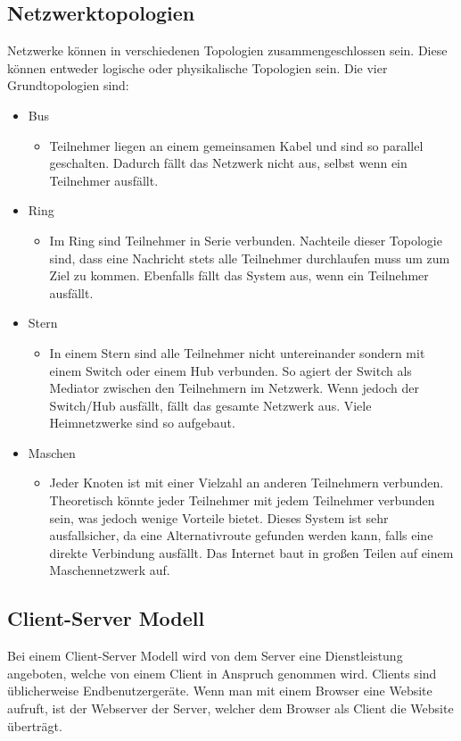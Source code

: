 \documentclass{article}
\begin{document}
	 \subsection{Netzwerktopologien}
	 Netzwerke können in verschiedenen Topologien zusammengeschlossen sein. Diese können entweder logische oder physikalische Topologien sein. Die vier Grundtopologien sind:
	 \begin{itemize}
	 	\item{Bus}
	 	\begin{itemize}
	 		\item{Teilnehmer liegen an einem gemeinsamen Kabel und sind so parallel geschalten. Dadurch fällt das Netzwerk nicht aus, selbst wenn ein Teilnehmer ausfällt.}
	 	\end{itemize}
	 	\item{Ring}
	 	\begin{itemize}
	 		\item{Im Ring sind Teilnehmer in Serie verbunden. Nachteile dieser Topologie sind, dass eine Nachricht stets alle Teilnehmer durchlaufen muss um zum Ziel zu kommen. Ebenfalls fällt das System aus, wenn ein Teilnehmer ausfällt.}
	 	\end{itemize}
	 	\item{Stern}
	 	\begin{itemize}
	 		\item{In einem Stern sind alle Teilnehmer nicht untereinander sondern mit einem Switch oder einem Hub verbunden. So agiert der Switch als Mediator zwischen den Teilnehmern im Netzwerk. Wenn jedoch der Switch/Hub ausfällt, fällt das gesamte Netzwerk aus. Viele Heimnetzwerke sind so aufgebaut.}
	 	\end{itemize}
	 	\item{Maschen}
	 	\begin{itemize}
	 		\item{Jeder Knoten ist mit einer Vielzahl an anderen Teilnehmern verbunden. Theoretisch könnte jeder Teilnehmer mit jedem Teilnehmer verbunden sein, was jedoch wenige Vorteile bietet. Dieses System ist sehr ausfallsicher, da eine Alternativroute gefunden werden kann, falls eine direkte Verbindung ausfällt. Das Internet baut in großen Teilen auf einem Maschennetzwerk auf.}
	 	\end{itemize}
	 \end{itemize}
	 \subsection{Client-Server Modell}
	 Bei einem Client-Server Modell wird von dem Server eine Dienstleistung angeboten, welche von einem Client in Anspruch genommen wird. Clients sind üblicherweise Endbenutzergeräte. Wenn man mit einem Browser eine Website aufruft, ist der Webserver der Server, welcher dem Browser als Client die Website überträgt. \\
\end{document}
